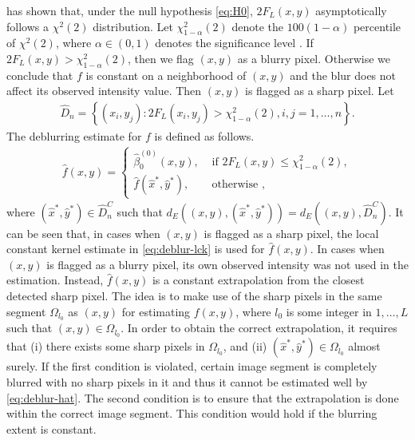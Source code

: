 \citet{kang2020consistent} has shown that, under the null hypothesis \eqref{eq:H0}, \(2F_L(x,y)\) asymptotically follows a \(\chi^2(2)\) distribution. Let \(\chi^2_{1-\alpha}(2)\) denote the \(100(1-\alpha)\) percentile of \(\chi^2(2)\), where \(\alpha\in(0,1)\) denotes the significance level . If \(2F_L(x,y) > \chi^2_{1-\alpha}(2)\), then we flag \((x,y)\) as a blurry pixel. Otherwise we conclude that \(f\) is constant on a neighborhood of \((x,y)\) and the blur does not affect its observed intensity value. Then \((x,y)\) is flagged as a sharp pixel. Let
\begin{align}
  \label{eq:blurry-pixel}
  \widehat{D}_n = \left\{ (x_i, y_j): 2F_L(x_i, y_j) > \chi^2_{1-\alpha}(2), i, j = 1, \ldots, n \right\}. 
\end{align}
The deblurring estimate for \(f\) is defined as follows.
\begin{align}
  \label{eq:deblur-hat}
  \widehat{f}(x,y) =
  \begin{cases}
    \widehat{\beta}_0^{(0)}(x, y), & \text{ if } 2F_L(x,y) \leq \chi^2_{1-\alpha}(2), \\
    \widehat{f}(\widehat{x}^*, \widehat{y}^*), & \text{ otherwise },
  \end{cases}
\end{align}
where \((\widehat{x}^*, \widehat{y}^*) \in \widehat{D}_n^C\) such that \(d_E((x,y), (\widehat{x}^*, \widehat{y}^*)) = d_E((x,y), \widehat{D}^C_n)\). It can be seen that, in cases when \((x, y)\) is flagged as a sharp pixel, the local constant kernel estimate in \eqref{eq:deblur-lck} is used for \(\widehat{f}(x,y)\). In cases when \((x, y)\) is flagged as a blurry pixel, its own observed intensity was not used in the estimation. Instead, \(\widehat{f}(x,y)\) is a constant extrapolation from the closest detected sharp pixel. The idea is to make use of the sharp pixels in the same segment \(\Omega_{l_0}\) as \((x,y)\) for estimating \(f(x,y)\), where \(l_0\) is some integer in \(1, \ldots, L\) such that \((x,y)\in \Omega_{l_0}\). In order to obtain the correct extrapolation, it requires that (i) there exists some sharp pixels in \(\Omega_{l_0}\), and (ii) \((\widehat{x}^*, \widehat{y}^*) \in \Omega_{l_0}\) almost surely. If the first condition is violated, certain image segment is completely blurred with no sharp pixels in it and thus it cannot be estimated well by \eqref{eq:deblur-hat}. The second condition is to ensure that the extrapolation is done within the correct image segment. This condition would hold if the blurring extent is constant.

